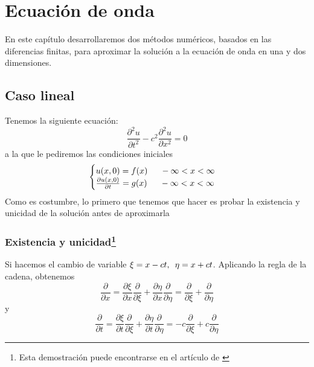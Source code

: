 \chapter{Ecuación de onda}
\label{cap:wave}
\begin{resumen}
	En este capítulo desarrollaremos dos métodos numéricos, basados en las diferencias finitas, para aproximar la solución a la ecuación de onda en una  y dos dimensiones.
\end{resumen}

\section{Caso lineal}
Tenemos la siguiente ecuación:
\begin{equation}
	\label{eq:1dwaveeq}
	\frac{\partial^2u}{\partial t^2} - c^2\frac{\partial^2u}{\partial x^2} = 0
\end{equation}
a la que le pediremos las condiciones iniciales
\begin{equation}
	\label{eq:1dwaveini}
\begin{cases}
	u(x,0) = f(x) \hspace{15px} -\infty < x < \infty \\
	\frac{\partial u(x,0)}{\partial t} = g(x) \hspace{15px} -\infty < x < \infty 
\end{cases}
\end{equation}
Como es costumbre, lo primero que tenemos que hacer es probar la existencia y unicidad de la solución antes de aproximarla
\subsection[Existencia y unicidad]{Existencia y unicidad\footnote{Esta demostración puede encontrarse en el artículo de \cite{1dwavedem}}}
Si hacemos el cambio de variable $\xi = x-ct, \hspace{5px} \eta = x+ct$. Aplicando la regla de la cadena, obtenemos
\begin{equation*}
	\frac{\partial}{\partial x} = \frac{\partial\xi}{\partial x}\frac{\partial}{\partial\xi} + \frac{\partial\eta}{\partial x}\frac{\partial}{\partial\eta} = \frac{\partial}{\partial\xi} + \frac{\partial}{\partial\eta}
\end{equation*}
y
\begin{equation*}
	\frac{\partial}{\partial t} = \frac{\partial\xi}{\partial t}\frac{\partial}{\partial\xi} + \frac{\partial\eta}{\partial t}\frac{\partial}{\partial\eta} = -c\frac{\partial}{\partial\xi} +c \frac{\partial}{\partial\eta}
\end{equation*}

